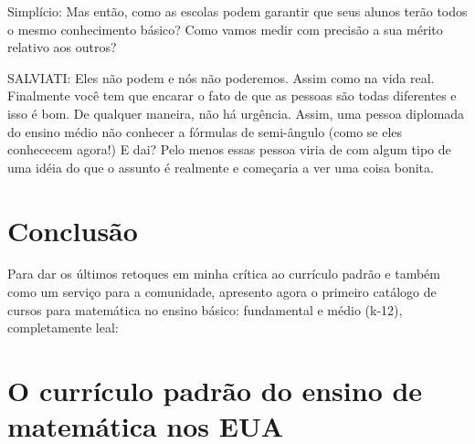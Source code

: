 \documentclass[a4paper,oneside,10pt,notitlepage]{article}
\begin{document}
Simplício: Mas então, como as escolas podem garantir que seus alunos terão todos o mesmo conhecimento básico? Como vamos medir com precisão a sua mérito relativo aos outros? 

SALVIATI: Eles não podem e nós não poderemos. Assim como na vida real. Finalmente você tem que encarar o fato de que as pessoas são todas diferentes e isso é bom. De qualquer maneira, não há urgência. Assim, uma pessoa diplomada do ensino médio não conhecer a fórmulas de semi-ângulo  (como se eles conhececem agora!) E dai? Pelo menos essas pessoa viria de com algum tipo de uma idéia do que o assunto é realmente e começaria a ver uma coisa bonita. 


\section*{Conclusão}
Para dar os últimos retoques em minha crítica ao currículo padrão e também como um serviço para a comunidade, apresento agora o primeiro catálogo de cursos para matemática no ensino básico: fundamental e médio (k-12), completamente leal:






\section*{O currículo padrão do ensino de matemática nos EUA}
\end{document}
